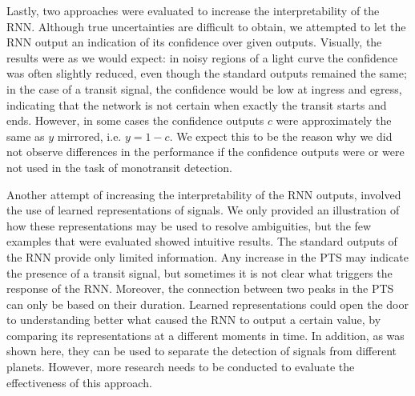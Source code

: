 Lastly, two approaches were evaluated to increase the interpretability of the RNN. Although true uncertainties are difficult to obtain, we attempted to let the RNN output an indication of its confidence over given outputs. Visually, the results were as we would expect: in noisy regions of a light curve the confidence was often slightly reduced, even though the standard outputs remained the same; in the case of a transit signal, the confidence would be low at ingress and egress, indicating that the network is not certain when exactly the transit starts and ends. However, in some cases the confidence outputs $c$ were approximately the same as $y$ mirrored, i.e. $y = 1-c$. We expect this to be the reason why we did not observe differences in the performance if the confidence outputs were or were not used in the task of monotransit detection.

Another attempt of increasing the interpretability of the RNN outputs, involved the use of learned representations of signals. We only provided an illustration of how these representations may be used to resolve ambiguities, but the few examples that were evaluated showed intuitive results. The standard outputs of the RNN provide only limited information. Any increase in the PTS may indicate the presence of a transit signal, but sometimes it is not clear what triggers the response of the RNN. Moreover, the connection between two peaks in the PTS can only be based on their duration. Learned representations could open the door to understanding better what caused the RNN to output a certain value, by comparing its representations at a different moments in time.  In addition, as was shown here, they can be used to separate the detection of signals from different planets. However, more research needs to be conducted to evaluate the effectiveness of this approach.
